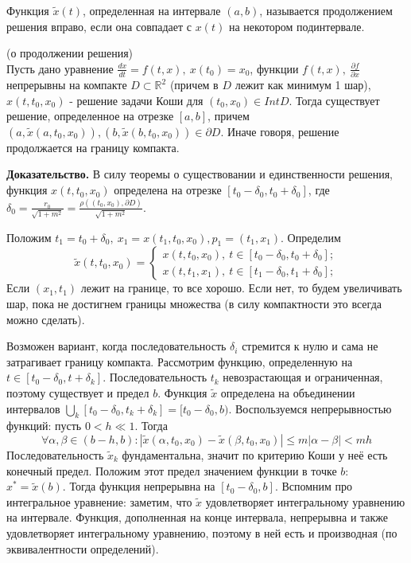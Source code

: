 \begin{defin}
Функция $\tilde x(t)$, определенная на интервале $(a,b)$, называется 
продолжением решения вправо, если она совпадает с $x(t)$ на некотором
подинтервале.
\end{defin}

\begin{theor}
    (о продолжении решения)\\
    Пусть дано уравнение $\frac{dx}{dt}=f(t,x),~x(t_0)=x_0$, 
    функции $f(t,x),~\frac{\partial f}{\partial x}$ непрерывны на компакте
    $D\subset \mathbb{R}^2$ (причем в $D$ лежит как минимум 1 шар),
    $x(t,t_0,x_0)$ - решение задачи Коши для  $(t_0,x_0)\in Int D$. 
    Тогда существует решение, определенное на отрезке $[a,b]$, причем
     $(a,\tilde x(a,t_0,x_0)),(b,\tilde x(b,t_0,x_0))\in \partial D$.
     Иначе говоря, решение продолжается на границу компакта.
\end{theor}
\textbf{Доказательство.} В силу теоремы о существовании и единственности 
решения, функция $x(t,t_0,x_0)$ определена на отрезке $[t_0-\delta_0,
t_0+\delta_0]$, где $\delta_0=\frac{r_0}{\sqrt{1+m^2} }= \frac{\rho((t_0,x_0),
\partial D)}{\sqrt{1+m^2} }$.

Положим $t_1=t_0+\delta_0,~x_1=x(t_1,t_0,x_0),p_1=(t_1,x_1)$. 
Определим 
$$\tilde x(t,t_0,x_0)=\begin{cases}
    x(t,t_0,x_0),~t\in [t_0-\delta_0,t_0+\delta_0];\\
    x(t,t_1,x_1),~t\in [t_1-\delta_0,t_1+\delta_0];
\end{cases}$$
Если $(x_1,t_1)$ лежит на границе, то все хорошо. Если нет, то будем 
увеличивать шар, пока не достигнем границы множества (в силу компактности 
это всегда можно сделать). 

Возможен вариант, когда последовательность $\delta_i$ стремится к нулю и 
сама не затрагивает границу компакта. Рассмотрим функцию, определенную 
на $t\in [t_0-\delta_0,t+\delta_k]$. Последовательность 
$t_k$ невозрастающая и ограниченная, поэтому существует и предел 
$b$. Функция $\tilde x$  определена на объединении интервалов
$\bigcup\limits_{k}[t_0-\delta_0,t_k+\delta_k]=[t_0-\delta_0,b)$.
Воспользуемся непрерывностью функций: пусть $0<h\ll1$.
Тогда $$\forall \alpha,\beta\in (b-h,b):|\tilde x(\alpha,t_0,x_0)-
\tilde x(\beta,t_0,x_0)|\leqslant m|\alpha-\beta|<mh$$ 
Последовательность $\tilde x_k$ фундаментальна, значит по критерию Коши 
у неё есть конечный предел. Положим этот предел значением функции 
в точке $b$:  $x^*=\tilde x(b)$. Тогда функция непрерывна на $[t_0-\delta_0,
b]$. Вспомним про интегральное уравнение: заметим, что $\tilde x$ 
удовлетворяет интегральному уравнению на интервале. Функция, дополненная
на конце интервала, непрерывна и также удовлетворяет интегральному 
уравнению, поэтому в ней есть и производная (по эквивалентности
определений).

